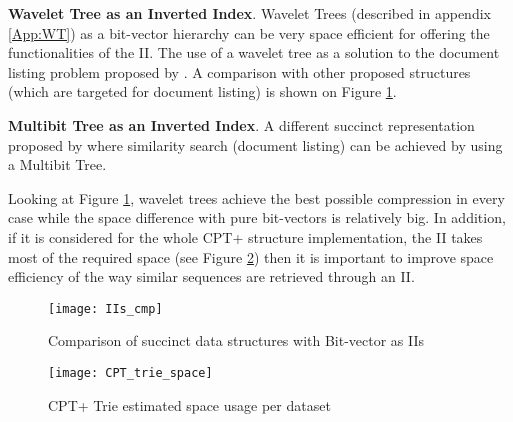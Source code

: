 \par\textbf{Wavelet Tree as an Inverted Index}. Wavelet Trees (described in appendix \ref{App:WT}) as a bit-vector hierarchy can be very space efficient for offering the functionalities of the II. The use of a wavelet tree as a solution to the document listing problem proposed by \citeauthor{tabei_tsuda_2011} \citeyear{tabei_tsuda_2011}. A comparison with other proposed structures (which are targeted for document listing) is shown on Figure \ref{fig:IIs_cmp}.

\par\textbf{Multibit Tree as an Inverted Index}. A different succinct representation proposed by \citeauthor{tabei_2012} \citeyear{tabei_2012} where similarity search (document listing) can be achieved by using a Multibit Tree.

Looking at Figure \ref{fig:IIs_cmp}, wavelet trees achieve the best possible compression in every case while the space difference with pure bit-vectors is relatively big. In addition, if it is considered for the whole CPT+ structure implementation, the II takes most of the required space (see Figure \ref{fig:CPT_trie_space}) then it is important to improve space efficiency of the way similar sequences are retrieved through an II.


\begin{figure}[h]
    \centering
    \texttt{[image: IIs\_cmp]}
    \caption{Comparison of succinct data structures with Bit-vector as IIs}
    \label{fig:IIs_cmp}
\end{figure}


\begin{figure}[h]
    \centering
    \texttt{[image: CPT\_trie\_space]}
    \caption{CPT+ Trie estimated space usage per dataset}
    \label{fig:CPT_trie_space}
\end{figure}



